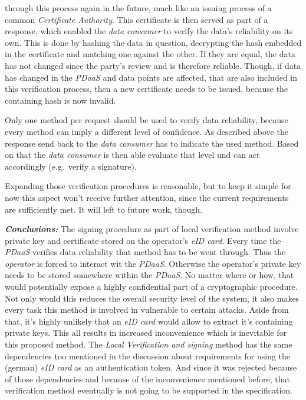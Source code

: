 \documentclass[12pt,english,a4paper,titlepage,cleardoublepage=empty,dottedtoc]{report}
\begin{document}
\begin{enumerate}
  through this process again in the future, much like an issuing process
  of a common \emph{Certificate Authority}. This certificate is then
  served as part of a response, which enabled the \emph{data consumer}
  to verify the data's reliability on its own. This is done by hashing
  the data in question, decrypting the hash embedded in the certificate
  and matching one against the other. If they are equal, the data has
  not changed since the party's review and is therefore reliable.
  Though, if data has changed in the \emph{PDaaS} and data points are
  affected, that are also included in this verification process, then a
  new certificate needs to be issued, because the containing hash is now
  invalid.
\end{enumerate}

Only one method per request should be used to verify data reliability,
because every method can imply a different level of confidence. As
described above the response send back to the \emph{data consumer} has
to indicate the used method. Based on that the \emph{data consumer} is
then able evaluate that level und can act accordingly (e.g.~verify a
signature).

Expanding those verification procedures is reasonable, but to keep it
simple for now this aspect won't receive further attention, since the
current requirements are sufficiently met. It will left to future work,
though.

\emph{\textbf{Conclusions:}} The signing procedure as part of local
verification method involve private key and certificate stored on the
operator's \emph{eID card}. Every time the \emph{PDaaS} verifies data
reliability that method has to be went through. Thus the \emph{operator}
is forced to interact wit the \emph{PDaaS}. Otherwise the operator's
private key needs to be stored somewhere within the \emph{PDaaS}. No
matter where or how, that would potentially expose a highly confidential
part of a cryptographic procedure. Not only would this reduces the
overall security level of the system, it also makes every task this
method is involved in vulnerable to certain attacks. Aside from that,
it's highly unlikely that an \emph{eID card} would allow to extract it's
containing private keys. This all results in increased inconvenience
which is inevitable for this proposed method. The \emph{Local
Verification and signing} method has the same dependencies too mentioned
in the discussion about requirements for using the (german) \emph{eID
card} as an authentication token. And since it was rejected because of
those dependencies and because of the inconvenience mentioned before,
that verification method eventually is not going to be supported in the
specification.
\end{document}
